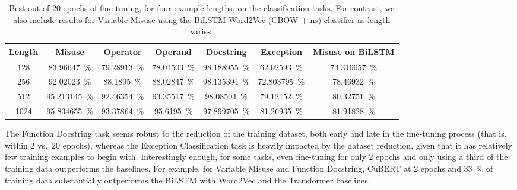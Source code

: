 \documentclass{article}
\newcommand{\BERTforCode}{CuBERT\xspace}
\newcommand{\update}[1]{#1}
\begin{document}
\begin{table*}
\centering
{}\begin{tabular}{cccccc|c}
\toprule \textbf{Length} & \textbf{Misuse} & \textbf{Operator} & \textbf{Operand} & \textbf{Docstring} & \textbf{Exception} & \textbf{Misuse on BiLSTM}\\ \midrule
128                                   &
\SI{83.96647}{\percent}&	\SI{79.28913}{\percent}&	\SI{78.01503}{\percent}&	\SI{98.188955}{\percent}&	\SI{62.02593}{\percent}&	\SI{74.316657}{\percent}
\\
256                                   & 
\SI{92.02023}{\percent}&	\SI{88.1895}{\percent}&	\SI{88.02847}{\percent}&	\SI{98.135394}{\percent}&	\SI{72.803795}{\percent}&	\SI{78.46932}{\percent}
\\
512                                   &
\SI{95.213145}{\percent}&	\SI{92.46354}{\percent}&	\SI{93.35517}{\percent}&	\SI{98.08504}{\percent}&	\SI{79.12152}{\percent}&	\SI{80.32751}{\percent}
\\
1024                                   &
\SI{95.834655}{\percent}&	\SI{93.37864}{\percent}&	\SI{95.6195}{\percent}&	\SI{97.899705}{\percent}&	\SI{81.26935}{\percent}&	\SI{81.91828}{\percent}
\\
\bottomrule
\end{tabular}
\caption{\update{Best out of 20 epochs of fine-tuning, for four example lengths, on the classification tasks. For contrast, we also include results for Variable Misuse using the BiLSTM Word2Vec (CBOW + ns) classifier as length varies.}}
\label{tab:SmallerLengths}
\end{table*}

\update{The Function Docstring task seems robust to the reduction of the training dataset, both early and late in the fine-tuning process (that is, within \num{2} vs.~\num{20} epochs), whereas the Exception Classification task is heavily impacted by the dataset reduction, given that it has relatively few training examples to begin with. Interestingly enough, for some tasks, even fine-tuning for only 2 epochs and only using a third of the training data outperforms the baselines. For example, for Variable Misuse and Function Docstring, \BERTforCode at 2 epochs and \SI{33}{\percent} of training data substantially outperforms the BiLSTM with Word2Vec and the Transformer baselines.}
\end{document}
